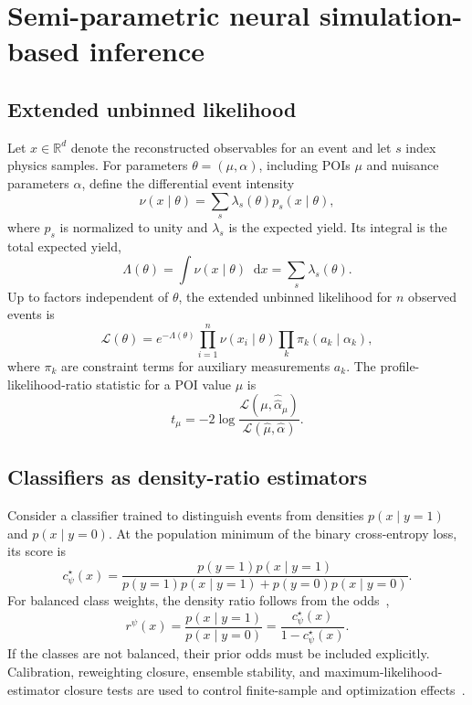 \documentclass[
  aps,
  prd,
  superscriptaddress,
  nofootinbib,
  longbibliography,
  12pt
]{revtex4-2}
\newcommand{\dd}{\mathop{}\!\mathrm{d}}
\newcommand{\R}{\mathbb{R}}
\newcommand{\Lcal}{\mathcal{L}}
\newcommand{\muhat}{\widehat\mu}
\begin{document}
\section{Semi-parametric neural simulation-based inference}
\label{sec:semiparametric}

\subsection{Extended unbinned likelihood}

Let $x\in\R^d$ denote the reconstructed observables for an event and let $s$ index physics samples.  For parameters $\theta=(\mu,\alpha)$, including POIs $\mu$ and nuisance parameters $\alpha$, define the differential event intensity
\begin{equation}
  \nu(x\mid\theta)
  =\sum_s \lambda_s(\theta)p_s(x\mid\theta),
  \label{eq:intensity}
\end{equation}
where $p_s$ is normalized to unity and $\lambda_s$ is the expected yield.  Its integral is the total expected yield,
\begin{equation}
  \Lambda(\theta)=\int\nu(x\mid\theta)\dd x
  =\sum_s\lambda_s(\theta).
\end{equation}
Up to factors independent of $\theta$, the extended unbinned likelihood for $n$ observed events is
\begin{equation}
  \Lcal(\theta)
  =e^{-\Lambda(\theta)}
   \prod_{i=1}^{n}\nu(x_i\mid\theta)
   \prod_k\pi_k(a_k\mid\alpha_k),
  \label{eq:extended-likelihood}
\end{equation}
where $\pi_k$ are constraint terms for auxiliary measurements $a_k$.  The profile-likelihood-ratio statistic for a POI value $\mu$ is
\begin{equation}
  t_\mu=-2\log
  \frac{\Lcal(\mu,\widehat{\widehat\alpha}_{\mu})}
       {\Lcal(\muhat,\widehat\alpha)}.
  \label{eq:profile-statistic}
\end{equation}

\subsection{Classifiers as density-ratio estimators}
\label{sec:ratio}

Consider a classifier trained to distinguish events from densities $p(x\mid y=1)$ and $p(x\mid y=0)$.  At the population minimum of the binary cross-entropy loss, its score is
\begin{equation}
  c^\star_\psi(x)
  =\frac{p(y=1)p(x\mid y=1)}
  {p(y=1)p(x\mid y=1)+p(y=0)p(x\mid y=0)}.
\end{equation}
For balanced class weights, the density ratio follows from the odds~\cite{Cranmer:2015bka},
\begin{equation}
  r^\psi(x)
  =\frac{p(x\mid y=1)}{p(x\mid y=0)}
  =\frac{c^\star_\psi(x)}{1-c^\star_\psi(x)}.
  \label{eq:classifier-ratio}
\end{equation}
If the classes are not balanced, their prior odds must be included explicitly.  Calibration, reweighting closure, ensemble stability, and maximum-likelihood-estimator closure tests are used to control finite-sample and optimization effects~\cite{ATLAS:2024rpr}.
\end{document}
